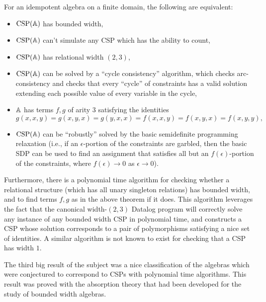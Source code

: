 \documentclass[letterpaper,11pt]{article}
\DeclareMathOperator{\CSP}{CSP}
\begin{document}
\begin{thm} For an idempotent algebra on a finite domain, the following are equivalent:
\begin{itemize}
\item $\CSP(\bA)$ has bounded width,

\item $\CSP(\bA)$ can't simulate any CSP which has the ability to count,

\item $\CSP(\bA)$ has relational width $(2,3)$,

\item $\CSP(\bA)$ can be solved by a ``cycle consistency'' algorithm, which checks arc-consistency and checks that every ``cycle'' of constraints has a valid solution extending each possible value of every variable in the cycle,

\item $\mathbb{A}$ has terms $f,g$ of arity $3$ satisfying the identities
\[
g(x,x,y) = g(x,y,x) = g(y,x,x) = f(x,x,y) = f(x,y,x) = f(x,y,y),
\]

\item $\CSP(\bA)$ can be ``robustly'' solved by the basic semidefinite programming relaxation (i.e., if an $\epsilon$-portion of the constraints are garbled, then the basic SDP can be used to find an assignment that satisfies all but an $f(\epsilon)$-portion of the constraints, where $f(\epsilon) \rightarrow 0$ as $\epsilon \rightarrow 0$).
\end{itemize}
\end{thm}

Furthermore, there is a polynomial time algorithm for checking whether a relational structure (which has all unary singleton relations) has bounded width, and to find terms $f,g$ as in the above theorem if it does. This algorithm leverages the fact that the canonical width-$(2,3)$ Datalog program will correctly solve any instance of any bounded width CSP in polynomial time, and constructs a CSP whose solution corresponds to a pair of polymorphisms satisfying a nice set of identities. A similar algorithm is not known to exist for checking that a CSP has width $1$.

The third big result of the subject was a nice classification of the algebras which were conjectured to correspond to CSPs with polynomial time algorithms. This result was proved with the absorption theory that had been developed for the study of bounded width algebras.
\end{document}
